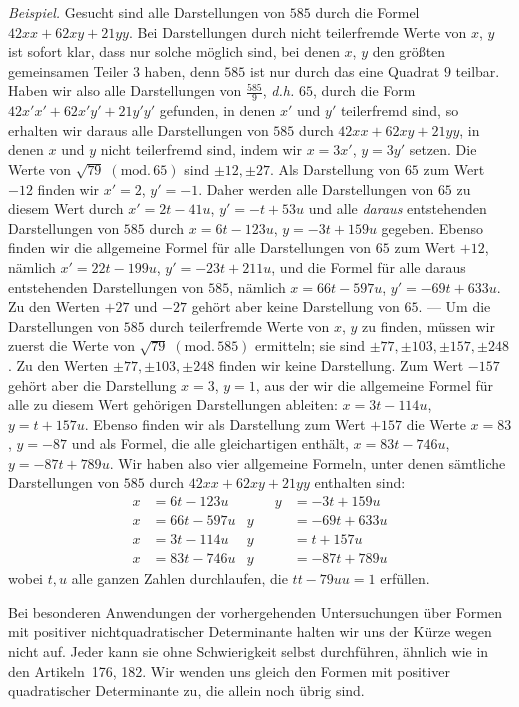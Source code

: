 \textit{Beispiel.} Gesucht sind alle Darstellungen von $585$ durch die Formel
$42xx+62xy+21yy$. Bei Darstellungen durch nicht teilerfremde Werte von $x$, $y$ ist sofort klar, dass nur solche möglich sind, bei denen $x$, $y$ den größten gemeinsamen Teiler $3$ haben, denn $585$ ist nur durch das eine Quadrat $9$ teilbar. Haben wir also alle Darstellungen von $\frac{585}{9}$, \textit{d.h.} $65$, durch die Form $42x'x'+62x'y'+21y'y'$ gefunden, in denen $x'$ und $y'$ teilerfremd sind, so erhalten wir daraus alle Darstellungen von $585$ durch $42xx+62xy+21yy$, in denen $x$ und $y$ nicht teilerfremd sind, indem wir $x=3x'$, $y=3y'$ setzen. Die Werte von $\sqrt{79}\;(\mathrm{mod.}\,65)$ sind $\pm12,\pm27$. Als Darstellung von $65$ zum Wert $-12$ finden wir $x'=2$, $y'=-1$. Daher werden alle Darstellungen von $65$ zu diesem Wert durch $x'=2t-41u$, $y'=-t+53u$ und alle \textit{daraus} entstehenden Darstellungen von $585$ durch $x=6t-123u$, $y=-3t+159u$ gegeben. Ebenso finden wir die allgemeine Formel für alle Darstellungen von $65$ zum Wert $+12$, nämlich $x'=22t-199u$, $y'=-23t+211u$, und die Formel für alle daraus entstehenden Darstellungen von $585$, nämlich $x=66t-597u$, $y'=-69t+633u$. Zu den Werten $+27$ und $-27$ gehört aber keine Darstellung von $65$. --- Um die Darstellungen von $585$ durch teilerfremde Werte von $x$, $y$ zu finden, müssen wir zuerst die Werte von $\sqrt{79}\;(\mathrm{mod.}\,585)$ ermitteln; sie sind $\pm77,\pm103,\pm157,\pm248$. Zu den Werten $\pm77,\pm103,\pm248$ finden wir keine Darstellung. Zum Wert $-157$ gehört aber die Darstellung $x=3$, $y=1$, aus der wir die allgemeine Formel für alle zu diesem Wert gehörigen Darstellungen ableiten: $x=3t-114u$, $y=t+157u$. Ebenso finden wir als Darstellung zum Wert $+157$ die Werte $x=83$, $y=-87$ und als Formel, die alle gleichartigen enthält, $x=83t-746u$, $y=-87t+789u$. Wir haben also vier allgemeine Formeln, unter denen sämtliche Darstellungen von $585$ durch $42xx+62xy+21yy$ enthalten sind:
\[
\begin{aligned}
x&=6t-123u&\qquad y&=-3t+159u\\
x&=66t-597u& y&=-69t+633u\\
x&=3t-114u& y&=t+157u\\
x&=83t-746u& y&=-87t+789u
\end{aligned}
\]
wobei $t,u$ alle ganzen Zahlen durchlaufen, die $tt-79uu=1$ erfüllen.

Bei besonderen Anwendungen der vorhergehenden Untersuchungen über Formen mit positiver nichtquadratischer Determinante halten wir uns der Kürze wegen nicht auf. Jeder kann sie ohne Schwierigkeit selbst durchführen, ähnlich wie in den Artikeln~176, 182. Wir wenden uns gleich den Formen mit positiver quadratischer Determinante zu, die allein noch übrig sind.
